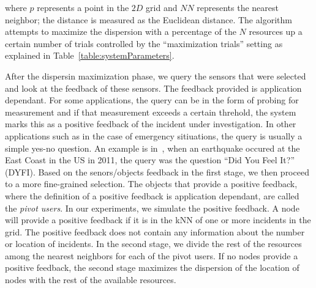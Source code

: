 \documentclass{acm_proc_article-sp}
\begin{document}
where $p$ represents a point in the $2D$ grid and $NN$ represents the nearest neighbor; the distance is measured as the Euclidean distance. The algorithm attempts to maximize the dispersion with a percentage of the $N$ resources up a certain number of trials controlled by the ``maximization trials'' setting as explained in Table~\ref{table:systemParameters}. \par
After the dispersin maximization phase, we query the sensors that were selected and look at the feedback of these sensors. The feedback provided is application dependant. For some applications, the query can be in the form of probing for measurement and if that measurement exceeds a certain threhold, the system marks this as a positive feedback of the incident under investigation. In other applications such as in the case of emergency sitiuations, the query is usually a simple yes-no question. An example is in~\cite{crooks2013earthquake}, when an earthquake occured at the East Coast in the US in 2011, the query was the question ``Did You Feel It?'' (DYFI). Based on the senors/objects feedback in the first stage, we then proceed to a more fine-grained selection. The objects that provide a positive feedback, where the definition of a positive feedback is application dependant, are called the \textit{pivot users}. In our experiments, we simulate the positive feedback. A node will provide a positive feedback if it is in the kNN of one or more incidents in the grid. The positive feedback does not contain any information about the number or location of incidents. In the second stage, we divide the rest of the resources among the nearest neighbors for each of the pivot users. If no nodes provide a positive feedback, the second stage maximizes the dispersion of the location of nodes with the rest of the available resources. \par
\end{document}
